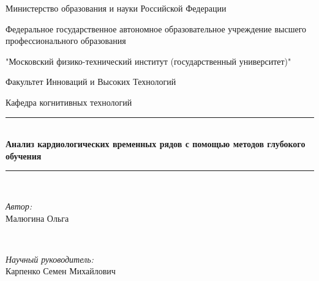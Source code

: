 \begin{titlepage}

\newcommand{\HRule}{\rule{\linewidth}{0.5mm}} %

\center %
 

Министерство образования и науки Российской Федерации

Федеральное государственное автономное образовательное учреждение высшего профессионального образования

"Московский физико-технический институт (государственный университет)"

Факультет Инноваций и Высоких Технологий

Кафедра когнитивных технологий \\[1.5cm]



\HRule \\[0.4cm]
{ \huge \bfseries Анализ кардиологических временных рядов с	помощью методов глубокого обучения}\\[0.4cm] %
\HRule \\[1.5cm]
 

\begin{minipage}{0.4\textwidth}
\begin{flushleft} \large
\emph{Автор:}\\
Малюгина Ольга %
\end{flushleft}
\end{minipage}
~
\begin{minipage}{0.4\textwidth}
\begin{flushright} \large
\emph{Научный руководитель:} \\
Карпенко Семен Михайлович%
\end{flushright}
\end{minipage}\\[4cm]




\end{titlepage}
